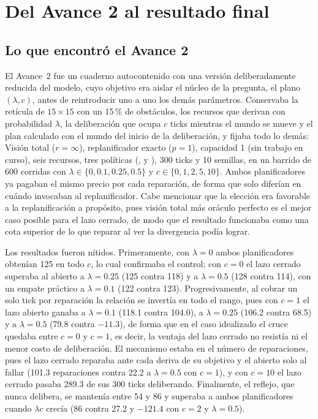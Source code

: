 \section{Del Avance 2 al resultado final}\label{sec:avance2}

\subsection{Lo que encontró el Avance 2}

El Avance~2 fue un cuaderno autocontenido con una versión deliberadamente reducida del modelo, cuyo objetivo era aislar el núcleo de la pregunta, el plano $(\lambda, c)$, antes de reintroducir uno a uno los demás parámetros. Conservaba la retícula de $15\times15$ con un 15\,\% de obstáculos, los recursos que derivan con probabilidad $\lambda$, la deliberación que ocupa $c$ ticks mientras el mundo se mueve y el plan calculado con el mundo del inicio de la deliberación, y fijaba todo lo demás: Visión total ($r=\infty$), replanificador exacto ($p=1$), capacidad 1 (sin trabajo en curso), seis recursos, tres políticas (\RX, \OL{} y \CL), 300 ticks y 10 semillas, en un barrido de 600 corridas con $\lambda\in\{0, 0.1, 0.25, 0.5\}$ y $c\in\{0,1,2,5,10\}$. Ambos planificadores ya pagaban el mismo precio por cada reparación, de forma que solo diferían en cuándo invocaban al replanificador. Cabe mencionar que la elección era favorable a la replanificación a propósito, pues visión total más oráculo perfecto es el mejor caso posible para el lazo cerrado, de modo que el resultado funcionaba como una cota superior de lo que reparar al ver la divergencia podía lograr.

Los resultados fueron nítidos. Primeramente, con $\lambda=0$ ambos planificadores obtenían 125 en todo $c$, lo cual confirmaba el control; con $c=0$ el lazo cerrado superaba al abierto a $\lambda=0.25$ (125 contra 118) y a $\lambda=0.5$ (128 contra 114), con un empate práctico a $\lambda=0.1$ (122 contra 123). Progresivamente, al cobrar un solo tick por reparación la relación se invertía en todo el rango, pues con $c=1$ el lazo abierto ganaba a $\lambda=0.1$ (118.1 contra 104.0), a $\lambda=0.25$ (106.2 contra 68.5) y a $\lambda=0.5$ (79.8 contra $-11.3$), de forma que en el caso idealizado el cruce quedaba entre $c=0$ y $c=1$, es decir, la ventaja del lazo cerrado no resistía ni el menor costo de deliberación. El mecanismo estaba en el número de reparaciones, pues el lazo cerrado reparaba ante cada deriva de su objetivo y el abierto solo al fallar (101.3 reparaciones contra 22.2 a $\lambda=0.5$ con $c=1$), y con $c=10$ el lazo cerrado pasaba 289.3 de sus 300 ticks deliberando. Finalmente, el reflejo, que nunca delibera, se mantenía entre 54 y 86 y superaba a ambos planificadores cuando $\lambda c$ crecía (86 contra 27.2 y $-121.4$ con $c=2$ y $\lambda=0.5$).

